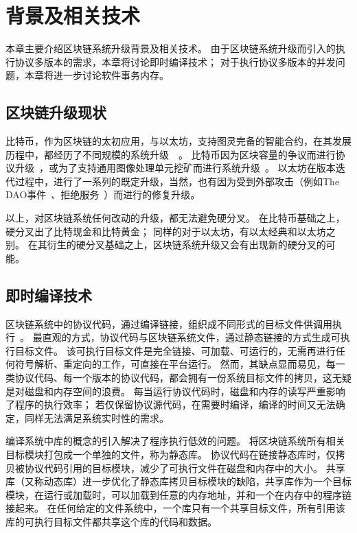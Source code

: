 
\section{背景及相关技术}

本章主要介绍区块链系统升级背景及相关技术。
由于区块链系统升级而引入的执行协议多版本的需求，本章将讨论即时编译技术；
对于执行协议多版本的并发问题，本章将进一步讨论软件事务内存。

\subsection{区块链升级现状}

比特币，作为区块链的太初应用，与以太坊，支持图灵完备的智能合约，在其发展历程中，都经历了不同规模的系统升级~\cite{bitcoinupgrade}~\cite{ethereumupgrade}。
比特币因为区块容量的争议而进行协议升级~\cite{bitcoincash}，或为了支持通用图像处理单元挖矿而进行系统升级~\cite{bitcoingold}。
以太坊在版本迭代过程中，进行了一系列的既定升级，当然，也有因为受到外部攻击（例如The
DAO事件~\cite{thedaoattack}、拒绝服务~\cite{eip150}）而进行的修复升级。

以上，对区块链系统任何改动的升级，都无法避免硬分叉。
在比特币基础之上，硬分叉出了比特现金和比特黄金；
同样的对于以太坊，有以太经典和以太坊之别。
在其衍生的硬分叉基础之上，区块链系统升级又会有出现新的硬分叉的可能。

\subsection{即时编译技术}

区块链系统中的协议代码，通过编译链接，组织成不同形式的目标文件供调用执行~\cite{bryant2003computer}。
最直观的方式，协议代码与区块链系统文件，通过静态链接的方式生成可执行目标文件。
该可执行目标文件是完全链接、可加载、可运行的，无需再进行任何符号解析、重定向的工作，可直接在平台运行。
然而，其缺点显而易见，每一类协议代码、每一个版本的协议代码，都会拥有一份系统目标文件的拷贝，这无疑是对磁盘和内存空间的浪费。
每当运行协议代码时，磁盘和内存的读写严重影响了程序的执行效率；
若仅保留协议源代码，在需要时编译，编译的时间又无法确定，同样无法满足系统实时性的需求。

编译系统中库的概念的引入解决了程序执行低效的问题。
将区块链系统所有相关目标模块打包成一个单独的文件，称为静态库。
协议代码在链接静态库时，仅拷贝被协议代码引用的目标模块，减少了可执行文件在磁盘和内存中的大小。
共享库（又称动态库）进一步优化了静态库拷贝目标模块的缺陷，共享库作为一个目标模块，在运行或加载时，可以加载到任意的内存地址，并和一个在内存中的程序链接起来。
在任何给定的文件系统中，一个库只有一个共享目标文件，所有引用该库的可执行目标文件都共享这个库的代码和数据。

